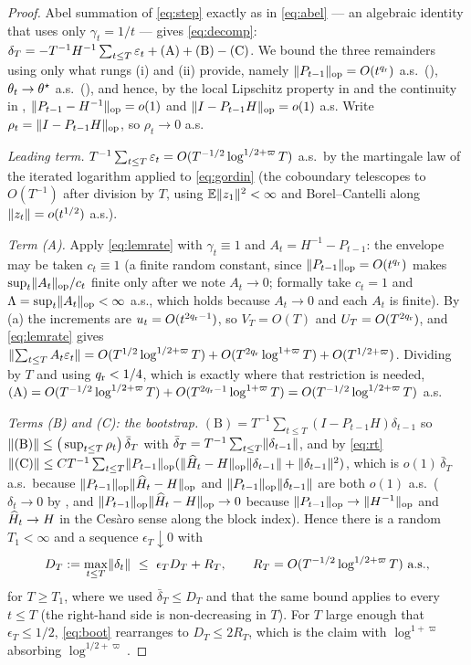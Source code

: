 \begin{proof}
Abel summation of \eqref{eq:step} exactly as in \eqref{eq:abel} --- an algebraic identity that
uses only $\gamma_t=1/t$ --- gives \eqref{eq:decomp}:
$\delta_T=-T^{-1}H^{-1}\sum_{t\le T}\varepsilon_t+(\mathrm A)+(\mathrm B)-(\mathrm C)$. We bound the
three remainders using only what rungs (i) and (ii) provide, namely
$\lVert P_{t-1} \rVert_{\mathrm{op}}=O(t^{q_{\mathrm r}})$ a.s.\ (), $\theta_t\to\theta^\star$ a.s.\
(), and hence, by the local Lipschitz property in  and the
continuity in \Cref{as:mom}, $\lVert P_{t-1}-H^{-1} \rVert_{\mathrm{op}}=o(1)$ and
$\lVert I-P_{t-1}H \rVert_{\mathrm{op}}=o(1)$ a.s. Write $\rho_t=\lVert I-P_{t-1}H \rVert_{\mathrm{op}}$, so $\rho_t\to0$ a.s.

\emph{Leading term.} $T^{-1}\sum_{t\le T}\varepsilon_t=O(T^{-1/2}\log^{1/2+\varpi}T)$ a.s.\ by the
martingale law of the iterated logarithm applied to \eqref{eq:gordin} (the coboundary
telescopes to $O(T^{-1})$ after division by $T$, using $\mathbb{E}\lVert z_1 \rVert^2<\infty$ and
Borel--Cantelli along $\lVert z_t \rVert=o(t^{1/2})$ a.s.).

\emph{Term (A).} Apply \eqref{eq:lemrate} with $\gamma_t\equiv1$ and
$A_t=H^{-1}-P_{t-1}$: the envelope may be taken $c_t\equiv1$ (a finite random constant, since
$\lVert P_{t-1} \rVert_{\mathrm{op}}=O(t^{q_{\mathrm r}})$ makes $\sup_t\lVert A_t \rVert_{\mathrm{op}}/c_t$ finite only after we note
$A_t\to0$; formally take $c_t=1$ and $\Lambda=\sup_t\lVert A_t \rVert_{\mathrm{op}}<\infty$ a.s., which holds
because $A_t\to0$ and each $A_t$ is finite). By \Cref{lem:incr}(a) the increments are
$u_t=O(t^{2q_{\mathrm r}-1})$, so $V_T=O(T)$ and $U_T=O(T^{2q_{\mathrm r}})$, and \eqref{eq:lemrate} gives
$\lVert\sum_{t\le T}A_t\varepsilon_t\rVert
=O(T^{1/2}\log^{1/2+\varpi}T)+O(T^{2q_{\mathrm r}}\log^{1+\varpi}T)+O(T^{1/2+\varpi})$.
Dividing by $T$ and using $q_{\mathrm r}<1/4$, which is exactly where that restriction is needed,
$(\mathrm A)=O(T^{-1/2}\log^{1/2+\varpi}T)+O(T^{2q_{\mathrm r}-1}\log^{1+\varpi}T)
=O(T^{-1/2}\log^{1/2+\varpi}T)$ a.s.

\emph{Terms (B) and (C): the bootstrap.} $(\mathrm B)=T^{-1}\sum_{t\le T}(I-P_{t-1}H)\delta_{t-1}$
so $\lVert (\mathrm B) \rVert\le\big(\sup_{t\le T}\rho_t\big)\,\bar\delta_T$ with
$\bar\delta_T=T^{-1}\sum_{t\le T}\lVert \delta_{t-1} \rVert$, and by \eqref{eq:rt}
$\lVert (\mathrm C) \rVert\le CT^{-1}\sum_{t\le T}\lVert P_{t-1} \rVert_{\mathrm{op}}
(\lVert \widehat H_t-H \rVert_{\mathrm{op}}\lVert \delta_{t-1} \rVert+\lVert \delta_{t-1} \rVert^2)$, which is
$o(1)\,\bar\delta_T$ a.s.\ because $\lVert P_{t-1} \rVert_{\mathrm{op}}\lVert \widehat H_t-H \rVert_{\mathrm{op}}$ and
$\lVert P_{t-1} \rVert_{\mathrm{op}}\lVert \delta_{t-1} \rVert$ are both $o(1)$ a.s.\ ($\delta_t\to0$ by ,
and $\lVert P_{t-1} \rVert_{\mathrm{op}}\lVert \widehat H_t-H \rVert_{\mathrm{op}}\to0$ because $\lVert P_{t-1} \rVert_{\mathrm{op}}\to\lVert H^{-1} \rVert_{\mathrm{op}}$ and
$\widehat H_t\to H$ in the Cesàro sense along the block index). Hence there is a random
$T_1<\infty$ and a sequence $\epsilon_T\downarrow0$ with
\begin{equation}
D_T:=\max_{t\le T}\norm{\delta_t}\ \le\ \epsilon_T D_T + R_T,
\qquad R_T=O(T^{-1/2}\log^{1/2+\varpi}T)\ \text{a.s.},
\label{eq:boot}
\end{equation}
for $T\ge T_1$, where we used $\bar\delta_T\le D_T$ and that the same bound applies to every
$t\le T$ (the right-hand side is non-decreasing in $T$). For $T$ large enough that
$\epsilon_T\le1/2$, \eqref{eq:boot} rearranges to $D_T\le2R_T$, which is the claim with
$\log^{1+\varpi}$ absorbing $\log^{1/2+\varpi}$.
\end{proof}

